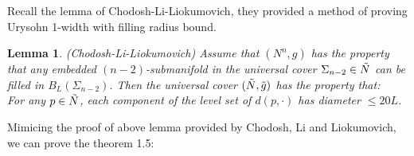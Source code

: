 \documentclass{amsart}
\newtheorem{lemma}[theorem]{Lemma}
\theoremstyle{definition}
\theoremstyle{remark}
\numberwithin{equation}{section}
\begin{document}
  Recall the lemma of Chodosh-Li-Liokumovich\cite{cll23}, they provided a method of proving Urysohn 1-width with filling radius bound. 

\begin{lemma}(Chodosh-Li-Liokumovich\cite{cll23})
Assume that $(N^{n},g)$ has the property that any embedded $(n-2)$-submanifold in the universal cover $\Sigma_{n-2}\in \Tilde{N}$ can be filled in $B_{L}(\Sigma_{n-2})$. Then the universal cover $(\Tilde{N},\Tilde{g})$ has the property that:\\
For any $p\in \Tilde{N}$, each component of the level set of $d(p,\cdot)$ has diameter $\leq 20L$.
\end{lemma}

Mimicing the proof of above lemma provided by Chodosh, Li and Liokumovich, we can prove the theorem 1.5:
\end{document}
